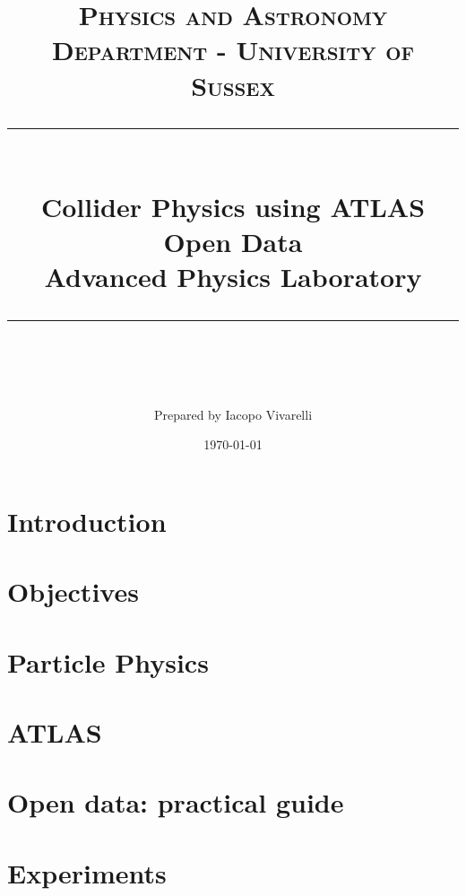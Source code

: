 \documentclass[11pt]{scrartcl} %
\title{	
	\normalfont\normalsize
	\textsc{Physics and Astronomy Department - University of Sussex}\\ %
	\vspace{25pt} %
	\rule{\linewidth}{0.5pt}\\ %
	\vspace{20pt} %
	{\huge Collider Physics using ATLAS Open Data}\\ %
	\vspace{0.5cm}
	{\large Advanced Physics Laboratory}
	\vspace{12pt} %
	\rule{\linewidth}{2pt}\\ %
	\vspace{12pt} %
}
\author{\large Prepared by Iacopo Vivarelli} %
\date{\normalsize\today} %
\begin{document}
\maketitle %

\clearpage

\tableofcontents

\newpage

\section{Introduction} 


\section{Objectives}
\label{sec:objectives} 


\clearpage

\section{Particle Physics} 
\label{sec:particle_physics}


\clearpage

\section{ATLAS}
\label{sec:ATLAS}



\clearpage

\section{Open data: practical guide}
\label{sec:open_data}


\clearpage

\section{Experiments}
\label{sec:experiments}


\clearpage


\appendix
{}

% 
\end{document}
